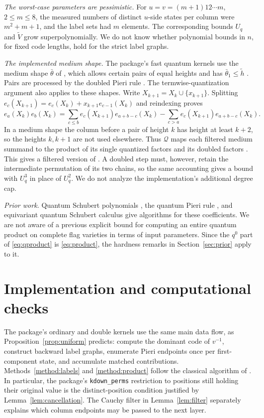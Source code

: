 \documentclass{amsart}
\theoremstyle{definition}
\theoremstyle{remark}
\numberwithin{equation}{section}
\begin{document}
\emph{The worst-case parameters are pessimistic.}
For $u=v=(m+1)12\cdots m$, $2\leq m\leq8$, the measured numbers of
distinct $u$-side states per column were $m^2+m+1$, and the label sets
had $m$ elements. The corresponding bounds $U_q$ and $\widetilde V$ grow
superpolynomially.
We do not know whether polynomial bounds in $n$, for fixed code
lengths, hold for the strict label graphs.

\emph{The implemented medium shape.}
The package's fast quantum kernels use the medium shape
$\bar\theta$ of \cite[Definition~4.1]{samuelquantum}, which allows
certain pairs of equal heights and has $\bar\theta_1\leq\tilde h$
\cite[Proposition~4.3]{samuelquantum}.
Pairs are processed by the doubled Pieri rule
\cite[Methods~4.14--4.15]{samuelquantum}.
The termwise-quantization argument also applies to these shapes.
Write $X_{k+1}=X_k\cup\{x_{k+1}\}$.
Splitting $e_c(X_{k+1})=e_c(X_k)+x_{k+1}e_{c-1}(X_k)$ and reindexing
proves
\[
 e_a(X_k)e_b(X_k)
 =\sum_{c\leq b}e_c(X_{k+1})e_{a+b-c}(X_k)
  -\sum_{c>a}e_c(X_{k+1})e_{a+b-c}(X_k).
\]
In a medium shape the column before a pair of height $k$ has height
at least $k+2$, so the heights $k,k+1$ are not used elsewhere.
Thus $\mathcal Q$ maps each filtered medium summand to the product of
its single quantized factors and its doubled factors
\cite[(4.1)]{samuelquantum}.
This gives a filtered version of \cite[Theorem~4.7]{samuelquantum}.
A doubled step must, however, retain the intermediate permutation of
its two chains, so the same accounting gives a bound with $U_q^3$ in
place of $U_q^2$.
We do not analyze the implementation's additional degree cap.

\emph{Prior work.}
Quantum Schubert polynomials \cite{fomin1997quantum}, the quantum Pieri
rule \cite{postnikov1999quantum}, and equivariant quantum Schubert calculus
\cite{mihalcea2006equivariant,lam2014quantum} give algorithms
for these coefficients.
We are not aware of a previous explicit bound for computing an entire
quantum product on complete flag varieties in terms of input
parameters.
Since the $q^0$ part of \eqref{eq:qproduct} is \eqref{eq:product},
the hardness remarks in Section~\ref{sec:prior} apply to it.

\section{Implementation and computational checks}\label{sec:implementation}

The package's ordinary and double kernels use the same main data flow,
as Proposition~\ref{prop:uniform} predicts:
compute the dominant code of $v^{-1}$, construct backward label graphs,
enumerate Pieri endpoints once per first-component state, and
accumulate matched contributions.
Methods~\ref{method:labels} and \ref{method:product} follow the classical
algorithm of \cite[Methods~4.9--4.11]{samuelquantum}.
In particular, the package's \texttt{kdown\_perms} restriction to positions
still holding their original value is the distinct-position condition
justified by Lemma~\ref{lem:cancellation}.
The Cauchy filter in Lemma~\ref{lem:filter} separately explains which
column endpoints may be passed to the next layer.
\end{document}
